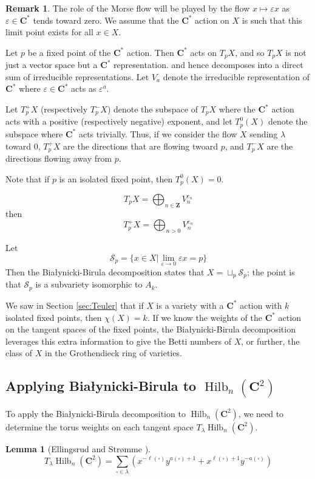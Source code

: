 \documentclass{amsart}[12pt]
\theoremstyle{definition}
\newtheorem{lemma}[dummy]{Lemma}
\newtheorem{remark}[dummy]{Remark}
\newcommand{\Z}{\mathbf{Z}}
\newcommand{\C}{\mathbf{C}}
\DeclareMathOperator{\Hilb}{Hilb}
\begin{document}
\begin{remark}
The role of the Morse flow will be played by the flow $x\mapsto \varepsilon x$ as $\varepsilon\in\C^*$ tends toward zero.  We assume that the $\C^*$ action on $X$ is such that this limit point exists for all $x\in X$.  

Let $p$ be a fixed point of the $\C^*$ action.  Then $\C^*$ acts on $T_pX$, and so $T_pX$ is not just a vector space but a $\C^*$ representation.   and hence decomposes into a direct sum of irreducible representations.  Let $V_a$ denote the irreducible representation of $\C^*$ where $\varepsilon\in\C^*$ acts as $\varepsilon^a$.  


Let $T_p^+X$ (respectively $T_p^-X$) denote the subspace of $T_pX$ where the $\C^*$ action acts with a positive (respectively negative) exponent, and let $T_p^0(X)$ denote the subspace where $\C^*$ acts trivially.  Thus, if we consider the flow $X$ sending $\lambda$ toward 0, $T_p^+X$ are the directions that are flowing twoard $p$, and $T_p^-X$ are the directions flowing away from $p$.  

Note that if $p$ is an isolated fixed point, then $T_p^0(X)=0$.

$$T_pX=\bigoplus_{n\in\Z} V_n^{e_n}$$
then
$$T_p^+X=\bigoplus_{n>0} V_n^{e_n}$$

Let 
$$\mathcal{S}_p=\{x\in X|\lim_{\varepsilon\to 0} \varepsilon x=p\}$$
Then the Bia\l ynicki-Birula decomposition states that $X=\sqcup_{p}\mathcal{S}_p$; the point is that $\mathcal{S}_p$ is a subvariety isomorphic to $A_k$.


We saw in Section \ref{sec:Teuler} that if $X$ is a variety with a $\C^*$ action with $k$ isolated fixed points, then $\chi(X)=k$.  If we know the weights of the $\C^*$ action on the tangent spaces of the fixed points, the Bia\l ynicki-Birula decomposition leverages this extra information to give the Betti numbers of $X$, or further, the class of $X$ in the Grothendieck ring of varieties.

\subsection{Applying Bia\l ynicki-Birula to $\Hilb_n(\C^2)$}
To apply the Bia\l ynicki-Birula decomposition to $\Hilb_n(\C^2)$, we need to determine the torus weights on each tangent space $T_\lambda\Hilb_n(\C^2)$.

\begin{lemma}[Ellingsrud and Str\o mme \cite{ES}] \label{lem:torus-weights}
$$T_\lambda \Hilb_n(\C^2)=\sum_{\square\in\lambda} \left(x^{-\ell(\square)} y^{a(\square)+1}+x^{\ell(\square)+1}y^{-a(\square)}\right)$$
\end{lemma}


\end{remark}
\end{document}
